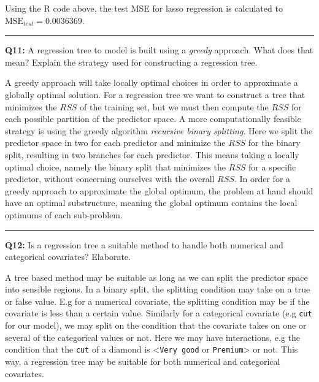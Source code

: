 \documentclass[]{article}
\begin{document}
Using the R code above, the test MSE for lasso regression is calculated
to \(\text{MSE}_{test} = 0.0036369\).

\begin{center}\rule{0.5\linewidth}{\linethickness}\end{center}

\textbf{Q11:} A regression tree to model is built using a \emph{greedy}
approach. What does that mean? Explain the strategy used for
constructing a regression tree.

A greedy approach will take locally optimal choices in order to
approximate a globally optimal solution. For a regression tree we want
to construct a tree that minimizes the \(RSS\) of the training set, but
we must then compute the \(RSS\) for each possible partition of the
predictor space. A more computationally feasible strategy is using the
greedy algorithm \emph{recursive binary splitting}. Here we split the
predictor space in two for each predictor and minimize the \(RSS\) for
the binary split, resulting in two branches for each predictor. This
means taking a locally optimal choice, namely the binary split that
minimizes the \(RSS\) for a specific predictor, without concerning
ourselves with the overall \(RSS\). In order for a greedy approach to
approximate the global optimum, the problem at hand should have an
optimal substructure, meaning the global optimum contains the local
optimums of each sub-problem.

\begin{center}\rule{0.5\linewidth}{\linethickness}\end{center}

\textbf{Q12:} Is a regression tree a suitable method to handle both
numerical and categorical covariates? Elaborate.

A tree based method may be suitable as long as we can split the
predictor space into sensible regions. In a binary split, the splitting
condition may take on a true or false value. E.g for a numerical
covariate, the splitting condition may be if the covariate is less than
a certain value. Similarly for a categorical covariate (e.g \texttt{cut}
for our model), we may split on the condition that the covariate takes
on one or several of the categorical values or not. Here we may have
interactions, e.g the condition that the \texttt{cut} of a diamond is
\textless{}\texttt{Very\ good} or \texttt{Premium}\textgreater{} or not.
This way, a regression tree may be suitable for both numerical and
categorical covariates.
\end{document}
